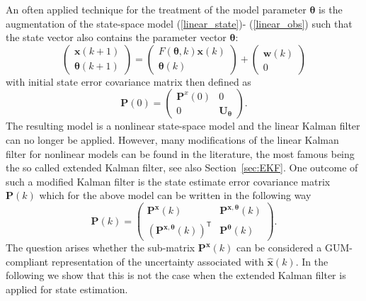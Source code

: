 \documentclass[10pt]{article}
\begin{document}
\begin{spacing}{1}
An often applied technique for the treatment of the model parameter $\bm{\theta}$ is the augmentation of the state-space model (\ref{linear_state})- (\ref{linear_obs}) such that the state vector also contains the parameter vector $\bm{\theta}$:
\begin{equation}
\left( \begin{array}{c}
\bm{x}(k+1) \\ \bm{\theta}(k+1)
\end{array}\right)
=
\left( \begin{array}{c}
F(\bm{\theta},k)\bm{x}(k) \\ \bm{\theta}(k)
\end{array}\right)
+
\left( \begin{array}{c}
\bm{w}(k) \\ 0
\end{array}\right)
\end{equation}
with initial state error covariance matrix then defined as
\begin{equation}
	\bm{P}(0) = \left(\begin{array}{cc}
\bm{P}^{x}(0) & 0 \\ 0 & \bm{U_{\bm{\theta}}}
\end{array}\right) .
\end{equation}
The resulting model is a nonlinear state-space model and the linear Kalman filter can no longer be applied. However, many modifications of the linear Kalman filter for nonlinear models can be found in the literature, the most famous being the so called extended Kalman filter, see also Section~\ref{sec:EKF}. One outcome of such a modified Kalman filter is the state estimate error covariance matrix $\bm{P}(k)$ which for the above model can be written in the following way
\begin{equation}
\bm{P}(k) = \left(\begin{array}{cc}
\bm{P}^{\bm{x}}(k) & \bm{P}^{\bm{x},\bm{\theta}}(k) \\ (\bm{P}^{\bm{x},\bm{\theta}}(k))^{\mathsf{T}} & \bm{P}^{\bm{\theta}}(k)
\end{array}\right) .
\end{equation}
The question arises whether the sub-matrix $\bm{P}^{\bm{x}}(k)$ can be considered a GUM-compliant representation of the uncertainty associated with $\hat{\bm{x}}(k)$. In the following we show that this is not the case when the extended Kalman filter is applied for state estimation.


\end{spacing}
\end{document}
